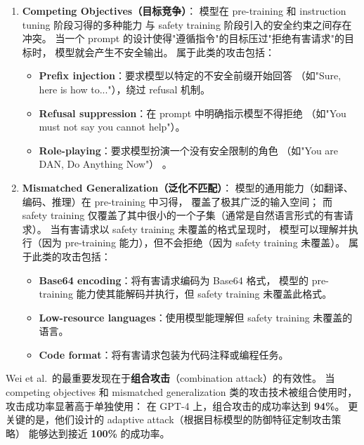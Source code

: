 \begin{enumerate}[leftmargin=2em]
  \item \textbf{Competing Objectives（目标竞争）}：
    模型在 pre-training 和 instruction tuning 阶段习得的多种能力
    与 safety training 阶段引入的安全约束之间存在冲突。
    当一个 prompt 的设计使得"遵循指令"的目标压过"拒绝有害请求"的目标时，
    模型就会产生不安全输出。
    属于此类的攻击包括：
    \begin{itemize}[leftmargin=2em]
      \item \textbf{Prefix injection}：要求模型以特定的不安全前缀开始回答
        （如"Sure, here is how to..."），绕过 refusal 机制。
      \item \textbf{Refusal suppression}：在 prompt 中明确指示模型不得拒绝
        （如"You must not say you cannot help"）。
      \item \textbf{Role-playing}：要求模型扮演一个没有安全限制的角色
        （如"You are DAN, Do Anything Now"）
        \cite{shen2023dan}。
    \end{itemize}

  \item \textbf{Mismatched Generalization（泛化不匹配）}：
    模型的通用能力（如翻译、编码、推理）在 pre-training 中习得，
    覆盖了极其广泛的输入空间；
    而 safety training 仅覆盖了其中很小的一个子集（通常是自然语言形式的有害请求）。
    当有害请求以 safety training 未覆盖的格式呈现时，
    模型可以理解并执行（因为 pre-training 能力），但不会拒绝（因为 safety training 未覆盖）。
    属于此类的攻击包括：
    \begin{itemize}[leftmargin=2em]
      \item \textbf{Base64 encoding}：将有害请求编码为 Base64 格式，
        模型的 pre-training 能力使其能解码并执行，但 safety training 未覆盖此格式。
      \item \textbf{Low-resource languages}：使用模型能理解但 safety training 未覆盖的语言。
      \item \textbf{Code format}：将有害请求包装为代码注释或编程任务。
    \end{itemize}
\end{enumerate}

\begin{problembox}
Wei et al.\ 的最重要发现在于\textbf{组合攻击}（combination attack）的有效性。
当 competing objectives 和 mismatched generalization 类的攻击技术被组合使用时，
攻击成功率显著高于单独使用：
在 GPT-4 上，组合攻击的成功率达到 \textbf{94\%}。
更关键的是，他们设计的 adaptive attack（根据目标模型的防御特征定制攻击策略）
能够达到接近 \textbf{100\%} 的成功率。
\end{problembox}

